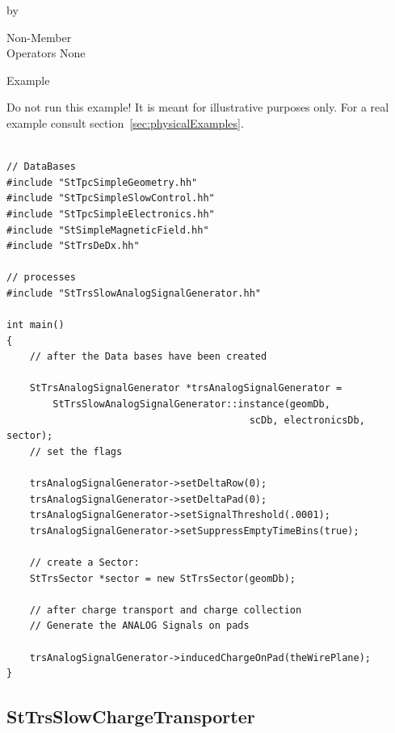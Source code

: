 \documentclass[twoside]{article}
\newcommand{\entrylabel}[1]{\mbox{\textbf{{#1}}}\hfil}%
\newenvironment{entry}
{\begin{list}{}%
    {\renewcommand{\makelabel}{\entrylabel}%
     \setlength{\labelwidth}{90pt}%
     \setlength{\leftmargin}{\labelwidth}
     \advance\leftmargin by \labelsep%
      }%
    }%
  {\end{list}}
\newcommand{\Entrylabel}[1]%
{\raisebox{0pt}[1ex][0pt]{\makebox[\labelwidth][l]%
    {\parbox[t]{\labelwidth}{\hspace{0pt}\textbf{{#1}}}}}}
\newenvironment{Entry}%
{\renewcommand{\entrylabel}{\Entrylabel}\begin{entry}}%
  {\end{entry}}
\begin{document}
\begin{Entry}
\item[Non-Member \\ Operators]
  None

\item[Example]

Do not run this example!  It is meant for illustrative purposes only.
For a real example consult section~\ref{sec:physicalExamples}.

{\footnotesize
\begin{verbatim}

// DataBases
#include "StTpcSimpleGeometry.hh"
#include "StTpcSimpleSlowControl.hh"
#include "StTpcSimpleElectronics.hh"
#include "StSimpleMagneticField.hh"
#include "StTrsDeDx.hh"

// processes
#include "StTrsSlowAnalogSignalGenerator.hh"

int main()
{
    // after the Data bases have been created

    StTrsAnalogSignalGenerator *trsAnalogSignalGenerator =
        StTrsSlowAnalogSignalGenerator::instance(geomDb, 
                                          scDb, electronicsDb, sector);
    // set the flags

    trsAnalogSignalGenerator->setDeltaRow(0);
    trsAnalogSignalGenerator->setDeltaPad(0);
    trsAnalogSignalGenerator->setSignalThreshold(.0001);
    trsAnalogSignalGenerator->setSuppressEmptyTimeBins(true);

    // create a Sector:
    StTrsSector *sector = new StTrsSector(geomDb);

    // after charge transport and charge collection
    // Generate the ANALOG Signals on pads

    trsAnalogSignalGenerator->inducedChargeOnPad(theWirePlane);
}
\end{verbatim}
}%


\end{Entry}
\clearpage

%
%
\subsection{StTrsSlowChargeTransporter} 
\label{sec:stTrsSlowChargeTransporter}
\end{document}
